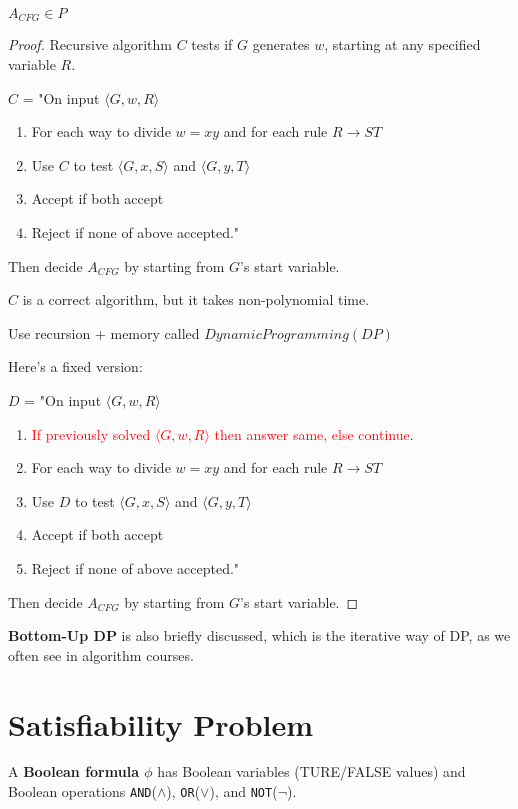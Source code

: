 \begin{theorem}
    \(A_{CFG} \in P\) 
\end{theorem}
\begin{proof}
    Recursive algorithm \(C\) tests if \(G\) generates \(w\), starting at any specified variable \(R\).    

    \(C\) = "On input \(\langle G, w, R \rangle\)
    \begin{enumerate}
        \item For each way to divide \(w = xy\) and for each rule \(R \rightarrow ST\)
        \item Use \(C\) to test \(\langle G, x, S \rangle\) and \(\langle G, y, T \rangle\) 
        \item Accept if both accept
        \item Reject if none of above accepted."    
    \end{enumerate}  
    Then decide \(A_{CFG}\) by starting from \(G\)'s start variable.  

    \(C\) is a correct algorithm, but it takes non-polynomial time. 

    \begin{remark}[Fix]
       Use recursion + memory called \(Dynamic Programming (DP)\)  
    \end{remark}

    Here's a fixed version:

    \(D\) = "On input \(\langle G, w, R \rangle\)
    \begin{enumerate}
        \item \textcolor{red}{If previously solved \(\langle G, w, R \rangle\) then answer same, else continue}. 
        \item For each way to divide \(w = xy\) and for each rule \(R \rightarrow ST\)
        \item Use \(D\) to test \(\langle G, x, S \rangle\) and \(\langle G, y, T \rangle\) 
        \item Accept if both accept
        \item Reject if none of above accepted."    
    \end{enumerate}  
    Then decide \(A_{CFG}\) by starting from \(G\)'s start variable.  
\end{proof}

\textbf{Bottom-Up DP} is also briefly discussed, which is the iterative way of DP, as we often see in algorithm courses.

\section{Satisfiability Problem}
\begin{definition}
    A \textbf{Boolean formula \(\phi\)}  has Boolean variables (TURE/FALSE values) and Boolean operations \verb|AND|(\(\land\)), \verb|OR|(\(\lor\)), and \verb|NOT|(\(\neg\)).
\end{definition}

